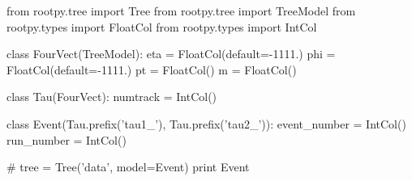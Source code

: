 \begin{footnotesize}
\begin{pyglist}[language=python,texcl=true,abovecaptionskip=0,style=vs,bgcolor=Moccasin]
from rootpy.tree import Tree
from rootpy.tree import TreeModel
from rootpy.types import FloatCol
from rootpy.types import IntCol

class FourVect(TreeModel):
    eta = FloatCol(default=-1111.)
    phi = FloatCol(default=-1111.)
    pt = FloatCol()
    m = FloatCol()

class Tau(FourVect):
    numtrack = IntCol()

class Event(Tau.prefix('tau1_'),
            Tau.prefix('tau2_')):
    event_number = IntCol()
    run_number = IntCol()

# tree = Tree('data', model=Event)
print Event
\end{pyglist}
\end{footnotesize}
